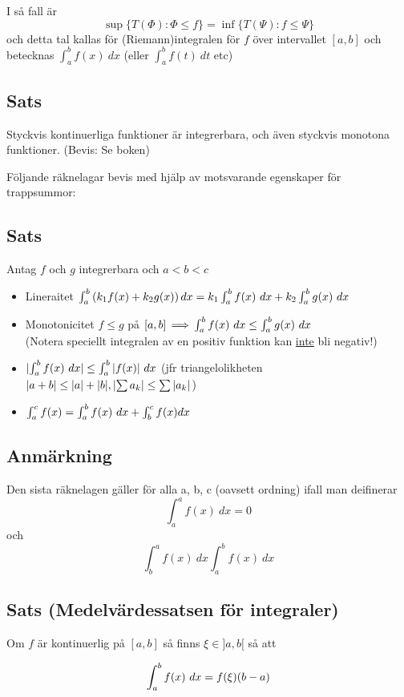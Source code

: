 \documentclass{article}
\begin{document}
I så fall är
$$\sup\{T(\Phi) : \Phi \le f\} = \inf \{T(\Psi) : f\le \Psi\}$$
och detta tal kallas för (Riemann)integralen för $f$ över intervallet $[a,b]$ och betecknas
$\int^b_a{f(x)\ dx}$ (eller $\int^b_a{f(t)\ dt}$ etc)

\subsection{Sats}
Styckvis kontinuerliga funktioner är integrerbara,
och även styckvis monotona funktioner.
(Bevis: Se boken)

Följande räknelagar bevis med hjälp av motsvarande egenskaper för trappsummor:

\subsection{Sats} Antag $f$ och $g$ integrerbara och $a<b<c$
\begin{itemize}
  \item Lineraitet $\int_a^b{\pa{k_1 f(x) + k_2 g(x)}dx} = k_1\int^b_a{f(x)\ dx} + k_2\int^b_a{g(x)\ dx}$
  \item Monotonicitet $f\le g$ på $[a,b] \operatorname{\implies} \int^b_a{f(x)\ dx} \le \int^b_a{g(x)\ dx}$
    \\(Notera speciellt integralen av en positiv funktion kan \uline{inte} bli negativ!)
  \item $\lvert\int^b_a{f(x)\ dx}\rvert \le \int^b_a{\lvert f(x)\rvert\ dx}$ (jfr triangelolikheten $\lvert a+b\rvert\le \lvert a\rvert + \lvert b\rvert, \lvert\sum{a_k}\rvert\le\sum{\lvert a_k\rvert}$)
  \item $\int^c_a{f(x)} = \int^b_a{f(x)\ dx} + \int^c_b{f(x) dx}$
\end{itemize}

\subsection{Anmärkning}
Den sista räknelagen gäller för alla a, b, c (oavsett ordning) ifall man deifinerar
$$ \int^a_a{f(x)\ dx}=0 $$ och $$\int^a_b{f(x)\ dx}\int^b_a{f(x)\ dx}$$

\subsection{Sats (Medelvärdessatsen för integraler)}
Om $f$ är kontinuerlig på $[a,b]$ så finns $\xi \in ]a,b[$ så att

$$ \int^b_a{f(x)\ dx} = f(\xi)(b-a) $$
\end{document}
